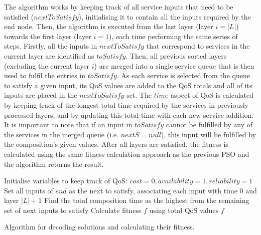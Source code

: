 \documentclass{llncs}
\begin{document}
The algorithm works by keeping track of all service inputs that need to be satisfied ($nextToSatisfy$), initialising it to contain all the inputs required by the end node. Then, the algorithm is executed from the last layer (layer $i = |L|$) towards the first layer (layer $i = 1$), each time performing the same series of steps. Firstly, all the inputs in $nextToSatisfy$ that correspond to services in the current layer are identified as $toSatisfy$. Then, all previous sorted layers (excluding the current layer $i$) are merged into a single service queue that is then used to fulfil the entries in $toSatisfy$. As each service is selected from the queue to satisfy a given input, its QoS values are added to the QoS totals and all of its inputs are placed in the $nextToSatisfy$ set. The $time$ aspect of QoS is calculated by keeping track of the longest total time required by the services in previously processed layers, and by updating this total time with each new service addition. It is important to note that if an input in $toSatisfy$ cannot be fulfilled by any of the services in the merged queue (i.e. $nextS = null$), this input will be fulfilled by the composition's given values. After all layers are satisfied, the fitness is calculated using the same fitness calculation approach as the previous PSO and the algorithm returns the result. 


\begin{algorithm}[!htb]
\setlength{}
 \LinesNumbered
 \SetNlSty{}{}{:}
 Initialise variables to keep track of QoS: $cost=0, availability=1, reliability=1$\;
 Set all inputs of $end$ as the next to satisfy, associating each input with time $0$ and layer $|L|+1$\;
 Find the total composition time as the highest from the remaining set of next inputs to satisfy\;
 Calculate fitness $f$ using total QoS values\;
 \Return $f$\;
\caption{Algorithm for decoding solutions and calculating their fitness.}
\label{solutionDecoding}
\end{algorithm}
\end{document}
